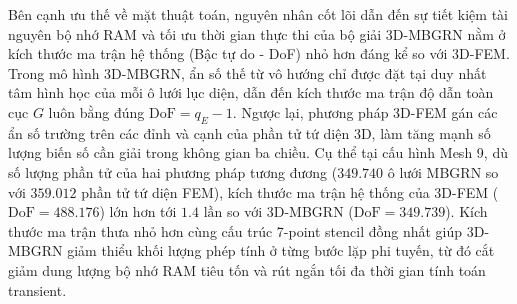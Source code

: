 \begin{table}[htbp]
\caption{Memory Usage and Execution Time Comparison Between 3D-MBGRN and 3D-FEM Across 9 Mesh Configurations}
\label{tab:computational_cost_comparison}
\centering
{}
\end{table}

Bên cạnh ưu thế về mặt thuật toán, nguyên nhân cốt lõi dẫn đến sự tiết kiệm tài nguyên bộ nhớ RAM và tối ưu thời gian thực thi của bộ giải 3D-MBGRN nằm ở kích thước ma trận hệ thống (Bậc tự do - DoF) nhỏ hơn đáng kể so với 3D-FEM. Trong mô hình 3D-MBGRN, ẩn số thế từ vô hướng chỉ được đặt tại duy nhất tâm hình học của mỗi ô lưới lục diện, dẫn đến kích thước ma trận độ dẫn toàn cục $G$ luôn bằng đúng $\text{DoF} = q_E - 1$. Ngược lại, phương pháp 3D-FEM gán các ẩn số trường trên các đỉnh và cạnh của phần tử tứ diện 3D, làm tăng mạnh số lượng biến số cần giải trong không gian ba chiều. Cụ thể tại cấu hình Mesh 9, dù số lượng phần tử của hai phương pháp tương đương ($349.740$ ô lưới MBGRN so với $359.012$ phần tử tứ diện FEM), kích thước ma trận hệ thống của 3D-FEM ($\text{DoF} = 488.176$) lớn hơn tới $1.4\text{ lần}$ so với 3D-MBGRN ($\text{DoF} = 349.739$). Kích thước ma trận thưa nhỏ hơn cùng cấu trúc 7-point stencil đồng nhất giúp 3D-MBGRN giảm thiểu khối lượng phép tính ở từng bước lặp phi tuyến, từ đó cắt giảm dung lượng bộ nhớ RAM tiêu tốn và rút ngắn tối đa thời gian tính toán transient.

